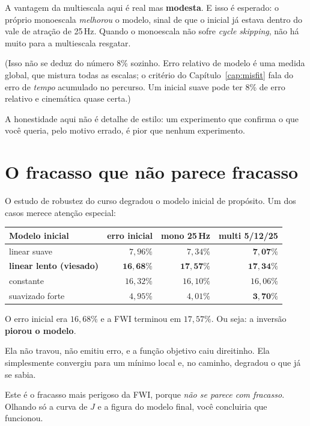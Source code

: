 \documentclass[11pt,a4paper,oneside]{report}
\begin{document}
\begin{atencao}
A vantagem da multiescala aqui \'e real mas \textbf{modesta}. E isso \'e
esperado: o pr\'oprio monoescala \emph{melhorou} o modelo, sinal de que o
inicial j\'a estava dentro do vale de atra\c{c}\~ao de 25\,Hz. Quando o
monoescala n\~ao sofre \emph{cycle skipping}, n\~ao h\'a muito para a
multiescala resgatar.

(Isso n\~ao se deduz do n\'umero 8\% sozinho. Erro relativo de modelo \'e uma
medida global, que mistura todas as escalas; o crit\'erio do
Cap\'itulo~\ref{cap:misfit} fala do erro de \emph{tempo} acumulado no percurso.
Um inicial suave pode ter 8\% de erro relativo e cinem\'atica quase certa.)

A honestidade aqui n\~ao \'e detalhe de estilo: um experimento que confirma o
que voc\^e queria, pelo motivo errado, \'e pior que nenhum experimento.
\end{atencao}

\section{O fracasso que n\~ao parece fracasso}

O estudo de robustez do curso degradou o modelo inicial de prop\'osito. Um dos
casos merece aten\c{c}\~ao especial:

\begin{center}
\begin{tabular}{@{}lrrr@{}}
\toprule
\textbf{Modelo inicial} & \textbf{erro inicial} & \textbf{mono 25\,Hz}
& \textbf{multi 5/12/25} \\
\midrule
linear suave              & $7{,}96\%$  & $7{,}34\%$  & $\mathbf{7{,}07\%}$ \\
\textbf{linear lento (viesado)} & $\mathbf{16{,}68\%}$ & $\mathbf{17{,}57\%}$
  & $\mathbf{17{,}34\%}$ \\
constante                 & $16{,}32\%$ & $16{,}10\%$ & $16{,}06\%$ \\
suavizado forte           & $4{,}95\%$  & $4{,}01\%$  & $\mathbf{3{,}70\%}$ \\
\bottomrule
\end{tabular}
\end{center}

\begin{armadilha}
O erro inicial era $16{,}68\%$ e a FWI terminou em $17{,}57\%$. Ou seja: a
invers\~ao \textbf{piorou o modelo}.

Ela n\~ao travou, n\~ao emitiu erro, e a fun\c{c}\~ao objetivo caiu
direitinho. Ela simplesmente convergiu para um m\'inimo local e, no caminho,
degradou o que j\'a se sabia.

Este \'e o fracasso mais perigoso da FWI, porque \emph{n\~ao se parece com
fracasso}. Olhando s\'o a curva de $J$ e a figura do modelo final, voc\^e
concluiria que funcionou.
\end{armadilha}
\end{document}

